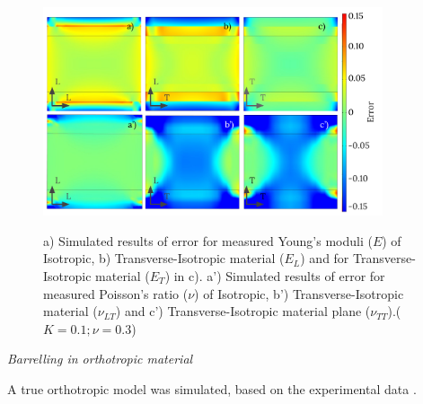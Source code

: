 \documentclass[review]{elsarticle}
\begin{document}
\begin{figure}[h]
\centering
\includegraphics[width=10cm]{BarellingError.pdf}
\label{fig:Error}
\caption{\label{fig:Error} a) Simulated results of error for measured Young's
moduli ($E$) of Isotropic, b) Transverse-Isotropic material ($E_L$) and for
Transverse-Isotropic material ($E_T$) in c). 
a') Simulated results of error for measured
Poisson's ratio ($\nu$) of Isotropic, b')
Transverse-Isotropic material ($\nu_{LT}$) and c') Transverse-Isotropic
material plane ($\nu_{TT}$).($K=0.1;\nu=0.3$)}

\end{figure}


\begin{description}
\item{\textit{Barrelling in orthotropic material}}
\end{description}

A true orthotropic model was simulated, based on the experimental data
\cite{vorobyevcharacterisation}.
\end{document}

